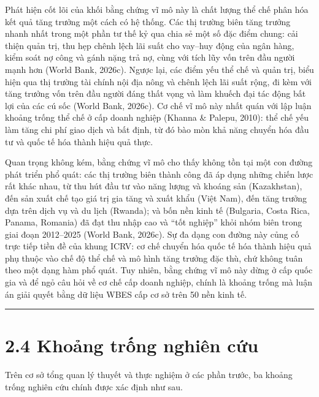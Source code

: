 \documentclass[
  a4paper,
  13pt]{extreport}
\begin{document}
Phát hiện cốt lõi của khối bằng chứng vĩ mô này là chất lượng thể chế
phân hóa kết quả tăng trưởng một cách có hệ thống. Các thị trường biên
tăng trưởng nhanh nhất trong một phần tư thế kỷ qua chia sẻ một số đặc
điểm chung: cải thiện quản trị, thu hẹp chênh lệch lãi suất cho vay--huy
động của ngân hàng, kiểm soát nợ công và gánh nặng trả nợ, cùng với tích
lũy vốn trên đầu người mạnh hơn (World Bank, 2026c). Ngược lại, các điểm
yếu thể chế và quản trị, biểu hiện qua thị trường tài chính nội địa nông
và chênh lệch lãi suất rộng, đi kèm với tăng trưởng vốn trên đầu người
đáng thất vọng và làm khuếch đại tác động bất lợi của các cú sốc (World
Bank, 2026c). Cơ chế vĩ mô này nhất quán với lập luận khoảng trống thể
chế ở cấp doanh nghiệp (Khanna \& Palepu, 2010): thể chế yếu làm tăng
chi phí giao dịch và bất định, từ đó bào mòn khả năng chuyển hóa đầu tư
và quốc tế hóa thành hiệu quả thực.

Quan trọng không kém, bằng chứng vĩ mô cho thấy không tồn tại một con
đường phát triển phổ quát: các thị trường biên thành công đã áp dụng
những chiến lược rất khác nhau, từ thu hút đầu tư vào năng lượng và
khoáng sản (Kazakhstan), đến sản xuất chế tạo giá trị gia tăng và xuất
khẩu (Việt Nam), đến tăng trưởng dựa trên dịch vụ và du lịch (Rwanda);
và bốn nền kinh tế (Bulgaria, Costa Rica, Panama, Romania) đã đạt thu
nhập cao và ``tốt nghiệp'' khỏi nhóm biên trong giai đoạn 2012--2025
(World Bank, 2026c). Sự đa dạng con đường này củng cố trực tiếp tiền đề
của khung ICRV: cơ chế chuyển hóa quốc tế hóa thành hiệu quả phụ thuộc
vào chế độ thể chế và mô hình tăng trưởng đặc thù, chứ không tuân theo
một dạng hàm phổ quát. Tuy nhiên, bằng chứng vĩ mô này dừng ở cấp quốc
gia và để ngỏ câu hỏi về cơ chế cấp doanh nghiệp, chính là khoảng trống
mà luận án giải quyết bằng dữ liệu WBES cấp cơ sở trên 50 nền kinh tế.

\begin{center}\rule{0.5\linewidth}{0.5pt}\end{center}

\hypertarget{khoux1ea3ng-trux1ed1ng-nghiuxean-cux1ee9u}{%
\section{2.4 Khoảng trống nghiên
cứu}\label{khoux1ea3ng-trux1ed1ng-nghiuxean-cux1ee9u}}

Trên cơ sở tổng quan lý thuyết và thực nghiệm ở các phần trước, ba
khoảng trống nghiên cứu chính được xác định như sau.
\end{document}
